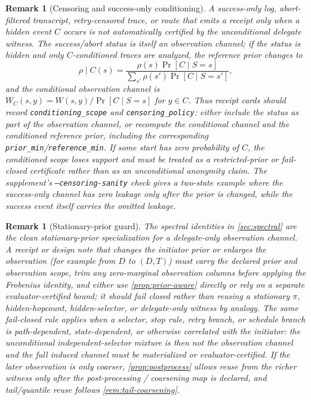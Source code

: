 \documentclass[11pt]{article}
\newtheorem{remark}[theorem]{Remark}
\begin{document}
\begin{remark}[Censoring and success-only conditioning]\label{rem:censoring}
A success-only log, abort-filtered transcript, retry-censored trace, or route that emits a receipt only when a hidden event $C$ occurs is not automatically certified by the unconditional delegate witness.  The success/abort status is itself an observation channel; if the status is hidden and only $C$-conditioned traces are analyzed, the reference prior changes to
\[
  \rho\mid C(s)=\frac{\rho(s)\Pr[C\mid S=s]}{\sum_{s'}\rho(s')\Pr[C\mid S=s']},
\]
and the conditional observation channel is $W_C(s,y)=W(s,y)/\Pr[C\mid S=s]$ for $y\in C$.  Thus receipt cards should record \texttt{conditioning\_scope} and \texttt{censoring\_policy}: either include the status as part of the observation channel, or recompute the conditional channel and the conditioned reference prior, including the corresponding \texttt{prior\_min}/\texttt{reference\_min}.  If some start has zero probability of $C$, the conditioned scope loses support and must be treated as a restricted-prior or fail-closed certificate rather than as an unconditional anonymity claim.  The supplement's \texttt{--censoring-sanity} check gives a two-state example where the success-only channel has zero leakage only after the prior is changed, while the success event itself carries the omitted leakage.
\end{remark}

\begin{remark}[Stationary-prior guard]
The spectral identities in \cref{sec:spectral} are the clean stationary-prior
specialization for a delegate-only observation channel.  A receipt or design note
that changes the initiator prior or enlarges the observation (for example from
$D$ to $(D,T)$) must carry the declared prior and observation scope, trim any
zero-marginal observation columns before applying the Frobenius identity, and either
use \cref{prop:prior-aware} directly or rely on a separate evaluator-certified
bound; it should fail closed rather than reusing a stationary $\pi$, hidden-hopcount, hidden-selector,
or delegate-only witness by analogy.  The same fail-closed rule applies when a
selector, stop rule, retry branch, or schedule branch is path-dependent, state-dependent,
or otherwise correlated with the initiator: the unconditional independent-selector
mixture is then not the observation channel and the full induced channel must be
materialized or evaluator-certified.  If the later observation is only coarser,
\cref{prop:postprocess} allows reuse from the richer witness only after the
post-processing / coarsening map is declared, and tail/quantile reuse follows \cref{rem:tail-coarsening}.
\end{remark}
\end{document}

